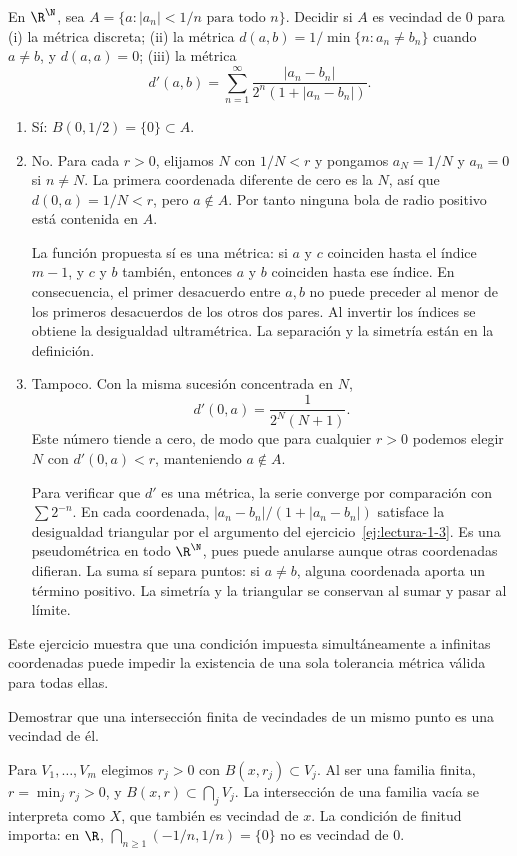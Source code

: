 \begin{ejercicio}\label{ej:lectura-2-1}
En $\R^{\N}$, sea $A=\{a:|a_n|<1/n\text{ para todo }n\}$. Decidir si $A$ es vecindad de $0$ para (i) la métrica discreta; (ii) la métrica $d(a,b)=1/\min\{n:a_n\ne b_n\}$ cuando $a\ne b$, y $d(a,a)=0$; (iii) la métrica
\[
d'(a,b)=\sum_{n=1}^{\infty}\frac{|a_n-b_n|}{2^n(1+|a_n-b_n|)}.
\]
\end{ejercicio}
\begin{solucion}
\begin{enumerate}[label=(\roman*)]
\item Sí: $B(0,1/2)=\{0\}\subset A$.
\item No. Para cada $r>0$, elijamos $N$ con $1/N<r$ y pongamos $a_N=1/N$ y $a_n=0$ si $n\ne N$. La primera coordenada diferente de cero es la $N$, así que $d(0,a)=1/N<r$, pero $a\notin A$. Por tanto ninguna bola de radio positivo está contenida en $A$.

La función propuesta sí es una métrica: si $a$ y $c$ coinciden hasta el índice $m-1$, y $c$ y $b$ también, entonces $a$ y $b$ coinciden hasta ese índice. En consecuencia, el primer desacuerdo entre $a,b$ no puede preceder al menor de los primeros desacuerdos de los otros dos pares. Al invertir los índices se obtiene la desigualdad ultramétrica. La separación y la simetría están en la definición.
\item Tampoco. Con la misma sucesión concentrada en $N$,
\[
d'(0,a)=\frac{1}{2^N(N+1)}.
\]
Este número tiende a cero, de modo que para cualquier $r>0$ podemos elegir $N$ con $d'(0,a)<r$, manteniendo $a\notin A$.

Para verificar que $d'$ es una métrica, la serie converge por comparación con $\sum2^{-n}$. En cada coordenada, $|a_n-b_n|/(1+|a_n-b_n|)$ satisface la desigualdad triangular por el argumento del ejercicio~\ref{ej:lectura-1-3}. Es una pseudométrica en todo $\R^{\N}$, pues puede anularse aunque otras coordenadas difieran. La suma sí separa puntos: si $a\ne b$, alguna coordenada aporta un término positivo. La simetría y la triangular se conservan al sumar y pasar al límite.
\end{enumerate}
Este ejercicio muestra que una condición impuesta simultáneamente a infinitas coordenadas puede impedir la existencia de una sola tolerancia métrica válida para todas ellas.
\end{solucion}

\begin{ejercicio}\label{ej:lectura-2-2}
Demostrar que una intersección finita de vecindades de un mismo punto es una vecindad de él.
\end{ejercicio}
\begin{solucion}
Para $V_1,\ldots,V_m$ elegimos $r_j>0$ con $B(x,r_j)\subset V_j$. Al ser una familia finita, $r=\min_jr_j>0$, y $B(x,r)\subset\bigcap_jV_j$. La intersección de una familia vacía se interpreta como $X$, que también es vecindad de $x$. La condición de finitud importa: en $\R$, $\bigcap_{n\ge1}(-1/n,1/n)=\{0\}$ no es vecindad de $0$.
\end{solucion}

